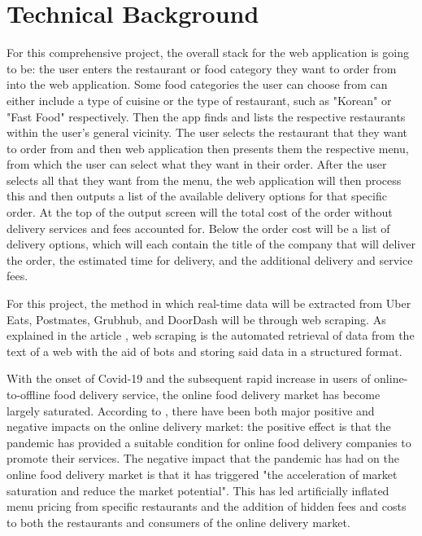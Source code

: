 \documentclass[10pt,twocolumn]{article}
\begin{document}
\section{Technical Background}

For this comprehensive project, the overall stack for the web application is going to be: the user enters the restaurant or food category they want to order from into the web application. Some food categories the user can choose from  can either include a type of cuisine or the type of restaurant, such as "Korean" or "Fast Food" respectively. Then the app finds and lists the respective restaurants within the user's general vicinity. The user selects the restaurant that they want to order from and then web application then presents them the respective menu, from which the user can select what they want in their order. After the user selects all that they want from the menu, the web application will then process this and then outputs a list of the available delivery options for that specific order. At the top of the output screen will the total cost of the order without delivery services and fees accounted for. Below the order cost will be a list of delivery options, which will each contain the title of the company that will deliver the order, the estimated time for delivery, and the additional delivery and service fees.

For this project, the method in which real-time data will be extracted from Uber Eats, Postmates, Grubhub, and DoorDash will be through web scraping. As explained in the article , web scraping is the automated retrieval of data from the text of a web with the aid of bots and storing said data in a structured format. 

With the onset of Covid-19 and the subsequent rapid increase in users of online-to-offline food delivery service, the online food delivery market has become largely saturated. According to , there have been both major positive and negative impacts on the online delivery market: the positive effect is that the pandemic has provided a suitable condition for online food delivery companies to promote their services. The negative impact that the pandemic has had on the online food delivery market is that it has triggered "the acceleration of market saturation and reduce the market potential". This has led artificially inflated menu pricing from specific restaurants and the addition of hidden fees and costs to both the restaurants and consumers of the online delivery market.
\end{document}
